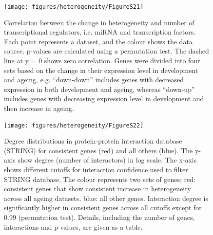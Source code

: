 \documentclass[12pt,twoside]{unicam}
\begin{document}
\begin{figure}

{\centering \texttt{[image: figures/heterogeneity/FigureS21]} 

}

\caption[Correlation between the change in heterogeneity and number of transcriptional regulators, stratified by the gene expression profile.]{Correlation between the change in heterogeneity and number of transcriptional regulators, i.e. miRNA and transcription factors. Each point represents a dataset, and the colour shows the data source. p-values are calculated using a permutation test. The dashed line at y = 0 shows zero correlation. Genes were divided into four sets based on the change in their expression level in development and ageing, e.g. “down-down” includes genes with decreased expression in both development and ageing, whereas “down-up” includes genes with decreasing expression level in development and then increase in ageing.}\label{fig:hetFigS21}
\end{figure}

\begin{figure}

{\centering \texttt{[image: figures/heterogeneity/FigureS22]} 

}

\caption[Degree distributions in protein-protein interaction database (STRING) for consistent genes and all others.]{Degree distributions in protein-protein interaction database (STRING) for consistent genes (red) and all others (blue). The y-axis show degree (number of interactors) in log scale. The x-axis shows different cutoffs for interaction confidence used to filter STRING database.  The colour represents two sets of genes; red: consistent genes that show consistent increase in heterogeneity across all ageing datasets, blue: all other genes. Interaction degree is significantly higher in consistent genes across all cutoffs except for 0.99 (permutation test). Details, including the number of genes, interactions and p-values, are given as a table.}\label{fig:hetFigS22}
\end{figure}
\end{document}
